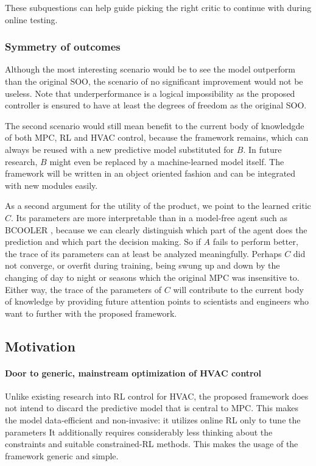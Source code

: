 \documentclass{article}
\theoremstyle{definition}
\theoremstyle{remark}
\begin{document}
These subquestions can help guide picking the right critic to continue with during online testing.

\subsubsection{Symmetry of outcomes}
Although the most interesting scenario would be to see the model outperform than the original SOO, the scenario of no significant improvement would not be useless. Note that underperformance is a logical impossibility as the proposed controller is ensured to have at least the degrees of freedom as the original SOO. 

The second scenario would still mean benefit to the current body of knowledgde of both MPC, RL and HVAC control, because the framework remains, which can always be reused with a new predictive model substituted for $B$. In future research, $B$ might even be replaced by a machine-learned model itself. The framework will be written in an object oriented fashion and can be integrated with new modules easily.

As a second argument for the utility of the product, we point to the learned critic $C$. Its parameters are more interpretable than in a model-free agent such as BCOOLER \cite{luo2022controlling}, because we can clearly distinguish which part of the agent does the prediction and which part the decision making. So if $A$ fails to perform better, the trace of its parameters can at least be analyzed meaningfully. Perhaps $C$ did not converge, or overfit during training, being swung up and down by the changing of day to night or seasons which the original MPC was insensitive to. Either way, the trace of the parameters of $C$ will contribute to the current body of knowledge by providing future attention points to scientists and engineers who want to further with the proposed framework.

\subsection{Motivation} \label{motivation}
\paragraph{Door to generic, mainstream optimization of HVAC control}
Unlike existing research into RL control for HVAC, the proposed framework does not intend to discard the predictive model that is central to MPC. This makes the model data-efficient and non-invasive: it utilizes online RL only to tune the parameters It additionally requires considerably less thinking about the constraints and suitable constrained-RL methods. This makes the usage of the framework generic and simple. 
\end{document}
